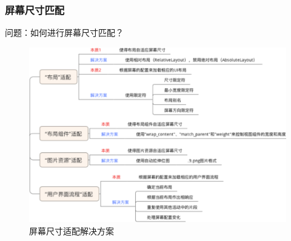 \documentclass[9pt, b5paper]{article}
\begin{document}
\subsubsection{屏幕尺寸匹配}
\label{sec-1-6-1}

问题：如何进行屏幕尺寸匹配？

\begin{figure}[htb]
\centering
\includegraphics[width=.9\linewidth]{./pic/screenSize.png}
\caption{屏幕尺寸适配解决方案}
\end{figure}
\end{document}
